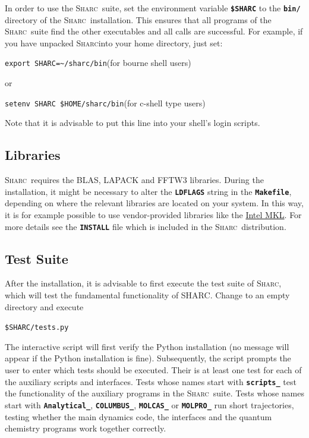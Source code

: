 \documentclass[a4paper,11pt,DIV=15,openany,twoside=false]{scrbook}
\newcommand{\sharc}{\textsc{Sharc}}
\newcommand{\ttt}[1]{\textbf{\texttt{#1}}}
\newenvironment{example}{
  \vspace{0mm}
  \definecolor{shadecolor}{HTML}{E4F4FF}
  \begin{shaded}
}{
  \end{shaded}
}
\begin{document}
In order to use the \sharc\ suite, set the environment variable \ttt{\$SHARC} to the \ttt{bin/} directory of the \sharc\ installation. This ensures that all programs of the \sharc\ suite find the other executables and all calls are successful. For example, if you have unpacked \sharc into your home directory, 
just set: 
\begin{example}
\verb|export SHARC=~/sharc/bin|\quad (for bourne shell users)
\end{example}
or
\begin{example}
\verb|setenv SHARC $HOME/sharc/bin|\quad (for c-shell type users)
\end{example}
Note that it is advisable to put this line into your shell's login
scripts.

\subsection{Libraries}

\sharc\ requires the BLAS, LAPACK and FFTW3 libraries. During the installation, it might be necessary to alter the \ttt{LDFLAGS} string in the \ttt{Makefile}, depending on where the relevant libraries are located on your system. In this way, it is for example possible to use vendor-provided libraries like the \href{https://software.intel.com/en-us/intel-mkl}{Intel MKL}. For more details see the \ttt{INSTALL} file which is included in the \sharc\ distribution.

\subsection{Test Suite}

After the installation, it is advisable to first execute the test suite of \sharc, which will test the fundamental functionality of SHARC.
Change to an empty directory and execute
\begin{example}
\verb|$SHARC/tests.py|
\end{example}
The interactive script will first verify the Python installation (no message will appear if the Python installation is fine). Subsequently, the script prompts the user to enter which tests should be executed. Their is at least one test for each of the auxiliary scripts and interfaces. Tests whose names start with \ttt{scripts\_} test the functionality of the auxiliary programs in the \sharc\ suite. Tests whose names start with \ttt{Analytical\_}, \ttt{COLUMBUS\_}, \ttt{MOLCAS\_} or \ttt{MOLPRO\_} run short trajectories, testing whether the main dynamics code, the interfaces and the quantum chemistry programs work together correctly.
\end{document}
